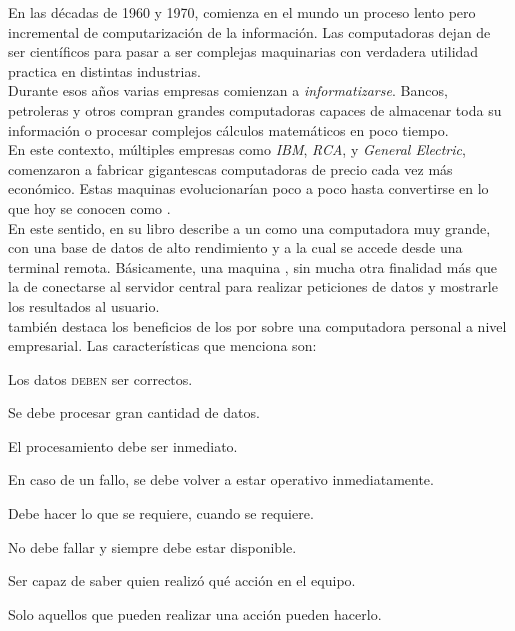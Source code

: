 En las décadas de 1960 y 1970, comienza en el mundo un proceso lento pero
incremental de computarización de la información. Las computadoras dejan de ser
 científicos para pasar a ser complejas maquinarias con
verdadera utilidad practica en distintas industrias.\\
Durante esos años varias empresas comienzan a \emph{informatizarse}. Bancos,
petroleras y otros compran grandes computadoras capaces de almacenar toda su
información o procesar complejos cálculos matemáticos en poco tiempo.\\
En este contexto, múltiples empresas como \emph{IBM}, \emph{RCA}, y 
\emph{General Electric}, comenzaron a fabricar gigantescas computadoras de
precio cada vez más económico. Estas maquinas evolucionarían poco a poco hasta
convertirse en lo que hoy se conocen como \mainframes.\\
En este sentido,  en su libro
  describe a un
\mainframe como una computadora muy grande, con una base de datos de alto
rendimiento y a la cual se accede desde una terminal remota. Básicamente, una
maquina , sin mucha otra finalidad más que la de conectarse al
servidor central para realizar peticiones de datos y mostrarle los resultados
al usuario.\\
\citeauthor{Stephens:2008:BOOK} también destaca los beneficios de los
\mainframes por sobre una computadora personal a nivel empresarial. Las
características que menciona son:
\begin{description}[
	font=$\bullet$\enskip,
	leftmargin={\parindent*4},
	labelindent=\parindent]
	\setlength{\itemsep}{1pt}
	\setlength{\parskip}{0pt}
	\setlength{\parsep}{0pt}
	\item[Integridad de datos:] Los datos \textsc{deben} ser correctos.
	\item[Rendimiento:] Se debe procesar gran cantidad de datos.
	\item[Respuesta:] El procesamiento debe ser inmediato.
	\item[Recuperación ante desastres:] En caso de un fallo, se debe volver a
										estar operativo inmediatamente.
	\item[Usabilidad:] Debe hacer lo que se requiere, cuando se requiere.
	\item[Confiabilidad:] No debe fallar y siempre debe estar disponible.
	\item[Auditoria:] Ser capaz de saber quien realizó qué acción en el equipo.
	\item[Seguridad:] Solo aquellos que pueden realizar una acción pueden
					  hacerlo.
\end{description}
